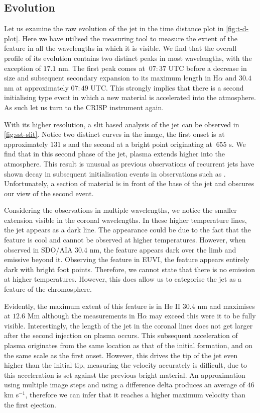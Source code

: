 \subsection{Evolution}
Let us examine the raw evolution of the jet in the time distance plot in \cref{fig:t-d-plot}.
Here we have utilised the measuring tool to measure the extent of the feature in all the wavelengths in which it is visible.
We find that the overall profile of its evolution contains two distinct peaks in most wavelengths, with the exception of $17.1$ nm.
The first peak comes at $~07:37$ UTC before a decrease in size and subsequent secondary expansion to its maximum length in H$\alpha$ and $30.4$ nm at approximately $07:49$ UTC.
This strongly implies that there is a second initialising type event in which a new material is accelerated into the atmosphere.
As such let us turn to the CRISP instrument again.

With its higher resolution, a slit based analysis of the jet can be observed in \cref{fig:sst-slit}.
Notice two distinct curves in the image, the first onset is at approximately $131$ s and the second at a bright point originating at $~655$ s.
We find that in this second phase of the jet, plasma extends higher into the atmosphere.
This result is unusual as previous observations of recurrent jets have shown decay in subsequent initialisation events in observations such as \cite{Jiang2007}.
Unfortunately, a section of material is in front of the base of the jet and obscures our view of the second event.

Considering the observations in multiple wavelengths, we notice the smaller extension visible in the coronal wavelengths.
In these higher temperature lines, the jet appears as a dark line.
The appearance could be due to the fact that the feature is cool and cannot be observed at higher temperatures.
However, when observed in SDO/AIA $30.4$ nm, the feature appears dark over the limb and emissive beyond it.
Observing the feature in EUVI, the feature appears entirely dark with bright foot points.
Therefore, we cannot state that there is no emission at higher temperatures. 
However, this does allow us to categorise the jet as a feature of the chromosphere.


Evidently, the maximum extent of this feature is in He II $30.4$ nm and maximises at $12.6$ Mm although the measurements in H$\alpha$ may exceed this were it to be fully visible.
Interestingly, the length of the jet in the coronal lines does not get larger after the second injection on plasma occurs.
This subsequent acceleration of plasma originates from the same location as that of the initial formation, and on the same scale as the first onset.
However, this drives the tip of the jet even higher than the initial tip, measuring the velocity accurately is difficult, due to this acceleration is set against the previous bright material.
An approximation using multiple image steps and using a difference delta produces an average of $46$ km s${^{-1}}$, therefore we can infer that it reaches a higher maximum velocity than the first ejection.

